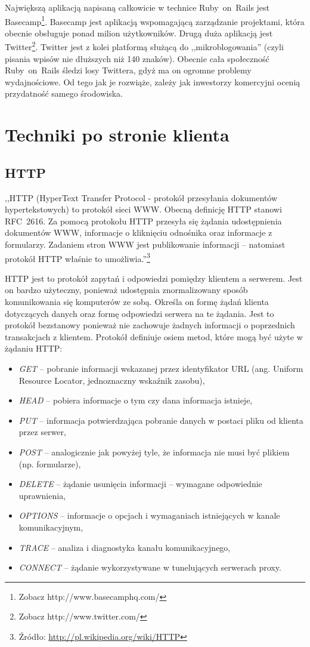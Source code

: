 \documentclass[a4paper,12pt,oneside]{report}
\begin{document}
Największą aplikacją napisaną całkowicie w technice Ruby~on~Rails jest Basecamp\footnote{Zobacz http://www.basecamphq.com/}. Basecamp jest aplikacją wspomagającą zarządzanie projektami, która obecnie obsługuje ponad milion użytkowników. Drugą duża aplikacją jest Twitter\footnote{Zobacz http://www.twitter.com/}. Twitter jest z kolei platformą służącą do ,,mikroblogowania'' (czyli pisania wpisów nie dłuższych niż 140 znaków). Obecnie cała społeczność Ruby~on~Rails śledzi losy Twittera, gdyż ma on ogromne problemy wydajnościowe. Od tego jak je rozwiąże, zależy jak inwestorzy komercyjni ocenią przydatność samego środowiska.

\chapter{Techniki po stronie klienta}
\label{cha:klient}

\section{HTTP}
\label{sec:http}
,,HTTP (HyperText Transfer Protocol - protokół przesyłania dokumentów hypertekstowych) to protokół sieci WWW. Obecną definicję HTTP stanowi RFC~2616. Za pomocą protokołu HTTP przesyła się żądania udostępnienia dokumentów WWW, informacje o kliknięciu odnośnika oraz informacje z formularzy. Zadaniem stron WWW jest publikowanie informacji -- natomiast protokół HTTP właśnie to umożliwia.''\footnote{Źródło: \url{http://pl.wikipedia.org/wiki/HTTP}}

HTTP jest to protokół zapytań i odpowiedzi pomiędzy klientem a serwerem. Jest on bardzo użyteczny, ponieważ udostępnia znormalizowany sposób komunikowania się komputerów ze sobą. Określa on formę żądań klienta dotyczących danych oraz formę odpowiedzi serwera na te żądania. Jest to protokół bezstanowy ponieważ nie zachowuje żadnych informacji o poprzednich transakcjach z klientem. Protokół definiuje osiem metod, które mogą być użyte w żądaniu HTTP:
\begin{itemize}
  \item \emph{GET} -- pobranie informacji wskazanej przez identyfikator URL (ang. Uniform Resource Locator, jednoznaczny wskaźnik zasobu),
  \item \emph{HEAD} -- pobiera informacje o tym czy dana informacja istnieje,
  \item \emph{PUT} -- informacja potwierdzająca pobranie danych w postaci pliku od klienta przez serwer,
  \item \emph{POST} -- analogicznie jak powyżej tyle, że informacja nie musi być plikiem (np. formularze),
  \item \emph{DELETE} -- żądanie usunięcia informacji -- wymagane odpowiednie uprawnienia,
  \item \emph{OPTIONS} -- informacje o opcjach i wymaganiach istniejących w kanale komunikacyjnym, 
  \item \emph{TRACE} -- analiza i diagnostyka kanału komunikacyjnego, 
  \item \emph{CONNECT} -- żądanie wykorzystywane w tunelujących serwerach proxy.
\end{itemize}
\end{document}
